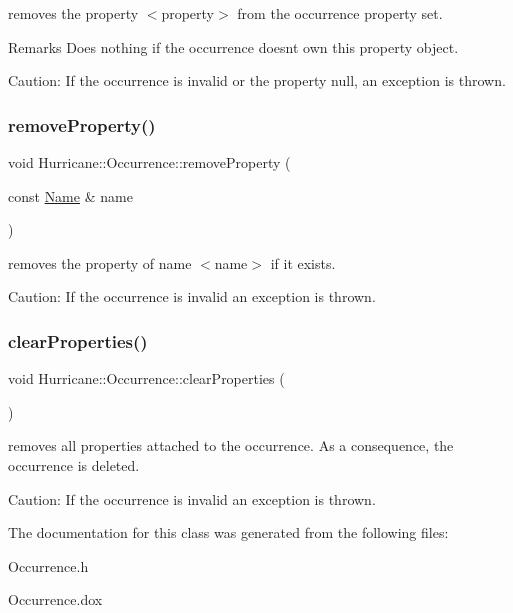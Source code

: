 removes the property {\ttfamily $<$property$>$} from the occurrence property set.

\begin{DoxyRemark}{Remarks}
Does nothing if the occurrence doesn\textquotesingle{}t own this property object.
\end{DoxyRemark}
\begin{DoxyParagraph}{Caution\+: If the occurrence is invalid or the property null, an }
exception is thrown. 
\end{DoxyParagraph}
\mbox{\label{classHurricane_1_1Occurrence_a8d86755bf50cbc7fd2849b039a372b0a}} 
\subsubsection{\texorpdfstring{remove\+Property()}{removeProperty()}}
{\footnotesize\ttfamily void Hurricane\+::\+Occurrence\+::remove\+Property (\begin{DoxyParamCaption}\item[{const \mbox{\hyperlink{classHurricane_1_1Name}{Name}} \&}]{name }\end{DoxyParamCaption})}

removes the property of name {\ttfamily $<$name$>$} if it exists.

\begin{DoxyParagraph}{Caution\+: If the occurrence is invalid an exception is thrown. }

\end{DoxyParagraph}
\mbox{\label{classHurricane_1_1Occurrence_ae9b269d39f3f68645d6d396d7ab5d8b7}} 
\subsubsection{\texorpdfstring{clear\+Properties()}{clearProperties()}}
{\footnotesize\ttfamily void Hurricane\+::\+Occurrence\+::clear\+Properties (\begin{DoxyParamCaption}{ }\end{DoxyParamCaption})}

removes all properties attached to the occurrence. As a consequence, the occurrence is deleted.

\begin{DoxyParagraph}{Caution\+: If the occurrence is invalid an exception is thrown. }

\end{DoxyParagraph}


The documentation for this class was generated from the following files\+:\begin{DoxyCompactItemize}
\item 
Occurrence.\+h\item 
Occurrence.\+dox\end{DoxyCompactItemize}
